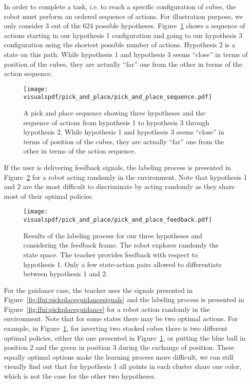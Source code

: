 In order to complete a task, i.e. to reach a specific configuration of cubes, the robot must perform an ordered sequence of actions. For illustration purpose, we only consider 3 out of the 624 possible hypotheses. Figure~\ref{fig:lfui:pickplacesequence} shows a sequence of actions starting in our hypothesis 1 configuration and going to our hypothesis 3 configuration using the shortest possible number of actions. Hypothesis 2 is a state on this path. While hypothesis 1 and hypothesis 3 seems ``close'' in terms of position of the cubes, they are actually ``far'' one from the other in terms of the action sequence.

\begin{figure}[H]
  \centering
  \texttt{[image: \\visualspdf/pick\_and\_place/pick\_and\_place\_sequence.pdf]}
  \caption{A pick and place sequence showing three hypotheses and the sequence of actions from hypothesis 1 to hypothesis 3 through hypothesis 2. While hypothesis 1 and hypothesis 3 seems ``close'' in terms of position of the cubes, they are actually ``far'' one from the other in terms of the action sequence.}
  \label{fig:lfui:pickplacesequence}
\end{figure}

If the user is delivering feedback signals, the labeling process is presented in Figure~\ref{fig:lfui:pickplacefeedback} for a robot acting randomly in the environment. Note that hypothesis 1 and 2 are the most difficult to discriminate by acting randomly as they share most of their optimal policies.

\begin{figure}[H]
  \centering
  \texttt{[image: \\visualspdf/pick\_and\_place/pick\_and\_place\_feedback.pdf]}
  \caption{Results of the labeling process for our three hypotheses and considering the feedback frame. The robot explores randomly the state space. The teacher provides feedback with respect to hypothesis 1. Only a few state-action pairs allowed to differentiate between hypothesis 1 and 2.}
  \label{fig:lfui:pickplacefeedback}
\end{figure}

For the guidance case, the teacher uses the signals presented in Figure~\ref{fig:lfui:pickplaceguidancesignals} and the labeling process is presented in Figure~\ref{fig:lfui:pickplaceguidance} for a robot action randomly in the environment. Note that for some states there may be two optimal actions. For example, in Figure~\ref{fig:lfui:pickplacesequence}, for inverting two stacked cubes there is two different optimal policies, either the one presented in Figure~\ref{fig:lfui:pickplacesequence}, or putting the blue ball in position 2 and the green in position 3 during the exchange of position. These equally optimal options make the learning process more difficult, we can still visually find out that for hypothesis 1 all points in each cluster share one color, which is not the case for the other two hypotheses.

